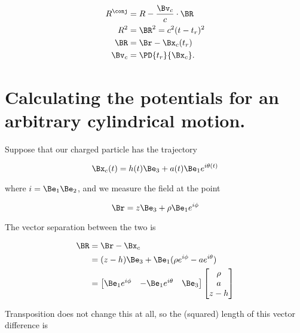\begin{align}\label{eqn:matrixVectorPotentials:n}
R^\conj &= R - \frac{\Bv_c}{c} \cdot \BR \\
R^2 &= \BR^2 = c^2( t - t_r)^2 \\
\BR &= \Br - \Bx_c(t_r) \\
\Bv_c &= \PD{t_r}{\Bx_c}.
\end{align}

\section{Calculating the potentials for an arbitrary cylindrical motion.}

Suppose that our charged particle has the trajectory

\begin{equation}\label{eqn:matrixVectorPotentials:n}
\Bx_c(t) = h(t) \Be_3 + a(t) \Be_1 e^{i \theta(t)}
\end{equation}

where $i = \Be_1 \Be_2$, and we measure the field at the point

\begin{equation}\label{eqn:matrixVectorPotentials:n}
\Br = z \Be_3 + \rho \Be_1 e^{i \phi}
\end{equation}

The vector separation between the two is

\begin{align*}
\BR 
&= \Br - \Bx_c \\
&= (z - h) \Be_3 + \Be_1 ( \rho e^{i\phi} - a e^{i\theta} ) \\
&=
\begin{bmatrix}
\Be_1 e^{i\phi} & - \Be_1 e^{i\theta} & \Be_3
\end{bmatrix}
\begin{bmatrix}
\rho \\
a \\
z - h
\end{bmatrix}
\end{align*}

Transposition does not change this at all, so the (squared) length of this vector difference is

